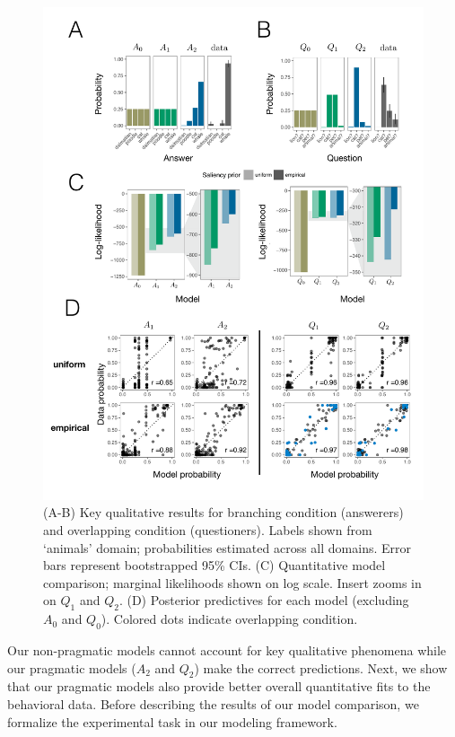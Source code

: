 \documentclass[12pt, floatsintext, jou]{apa6}
\begin{document}
\begin{figure}[tbh!]
\begin{center}
\includegraphics[scale = .77]{ResultsFig.pdf}
\end{center}
\vspace{-2cm}
\caption{(A-B) Key qualitative results for branching condition (answerers) and overlapping condition (questioners). Labels shown from `animals' domain; probabilities estimated across all domains. Error bars represent bootstrapped 95\% CIs. (C) Quantitative model comparison; marginal likelihoods shown on log scale. Insert zooms in on $Q_1$ and $Q_2$. (D) Posterior predictives for each model (excluding $A_0$ and $Q_0$). Colored dots indicate overlapping condition.}
\label{fig:results}
\end{figure}

Our non-pragmatic models cannot account for key qualitative phenomena while our pragmatic models ($A_2$ and $Q_2$) make the correct predictions. Next, we show that our pragmatic models also provide better overall quantitative fits to the behavioral data. Before describing the results of our model comparison, we formalize the experimental task in our modeling framework. 
\end{document}
